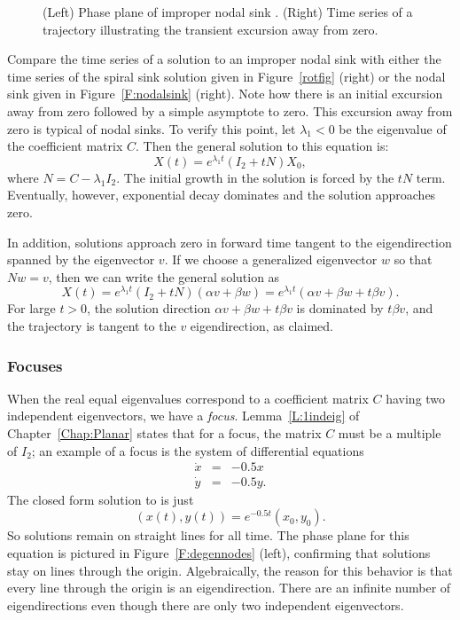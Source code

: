 \documentclass{ximera}
\begin{document}
\begin{figure}[htb]
           \centerline{%
           }
           \caption{(Left) Phase plane of improper nodal sink
	       \protect{}.  (Right) Time series of
		a trajectory illustrating the transient excursion
		away from zero.}
           \label{F:degennodal}
\end{figure}

Compare the time series of a solution to an improper nodal sink
with either the time series of the spiral sink solution given
in Figure~\ref{rotfig} (right) or the nodal sink given in
Figure~\ref{F:nodalsink} (right).  Note how there is an initial
excursion away from zero followed by a simple asymptote to zero.
This excursion away from zero is typical of nodal sinks. To verify
this point, let $\lambda_1<0$ be the eigenvalue of the coefficient
matrix $C$.  Then the general solution to this equation is:
\[
X(t) = e^{\lambda_1 t}(I_2 + tN)X_0,
\]
where $N = C-\lambda_1 I_2$.
The initial growth in the solution is forced by the $tN$ term.
Eventually, however, exponential decay dominates and the solution
approaches zero.

In addition, solutions approach zero in forward time tangent to
the eigendirection spanned by the eigenvector $v$.  If we choose
a generalized eigenvector $w$ so that $Nw=v$, then we can write the
general solution as
\[
X(t) =  e^{\lambda_1 t}(I_2 + tN)(\alpha v+\beta w) =
e^{\lambda_1 t}\left(\alpha v + \beta w +  t\beta v \right).
\]
For large $t>0$, the solution direction $\alpha v + \beta w + t\beta v$ is
dominated by $t\beta v$, and the trajectory is tangent to the $v$
eigendirection, as claimed.


\subsubsection*{Focuses}

When the real equal eigenvalues correspond to a coefficient matrix $C$
having two independent eigenvectors, we have a {\em focus\/}.
Lemma~\ref{L:1indeig} of Chapter~\ref{Chap:Planar} states that for a focus,
the matrix $C$ must be a multiple of $I_2$; an example of a focus is the
system of differential equations
\begin{equation}  \label{e:focuseqn}
\begin{array}{rcl}
\dot{x} & = & -0.5x \\
\dot{y} & = & -0.5y.
\end{array}
\end{equation}
The closed form solution to  is just
\[
(x(t),y(t)) = e^{-0.5t}(x_0,y_0).
\]
So solutions remain on straight lines for all time.  The phase
plane for this equation is
pictured in Figure~\ref{F:degennodes}
(left), confirming that solutions stay on lines through the
origin.  Algebraically, the reason for this behavior is that every
line through the origin is an eigendirection.  There are an infinite number
of eigendirections even though there are only two independent eigenvectors.
\end{document}
